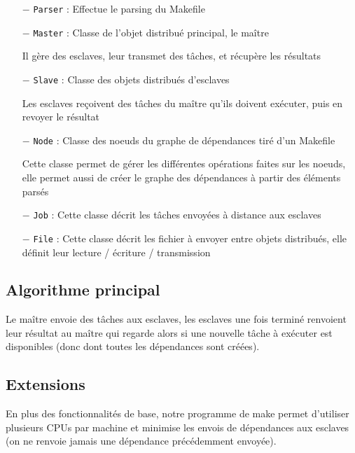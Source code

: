 \documentclass[a4paper, 11pt, titlepage]{article}
\begin{document}
\begin{itemize}

\item[$-$]
\lstinline!Parser! :
Effectue le parsing du Makefile

\item[$-$]
\lstinline!Master! :
Classe de l'objet distribué principal, le maître

Il gère des esclaves, leur transmet des tâches,
et récupère les résultats

\item[$-$]
\lstinline!Slave! :
Classe des objets distribués d'esclaves

Les esclaves reçoivent des tâches du maître qu'ils doivent exécuter,
puis en revoyer le résultat

\item[$-$]
\lstinline!Node! :
Classe des noeuds du graphe de dépendances tiré d'un Makefile

Cette classe permet de gérer les différentes opérations faites sur les noeuds, elle permet aussi de créer le graphe des dépendances à partir des éléments parsés


\item[$-$]
\lstinline!Job! :
Cette classe décrit les tâches envoyées à distance aux esclaves


\item[$-$]
\lstinline!File! :
Cette classe décrit les fichier à envoyer entre objets distribués,
elle définit leur lecture / écriture / transmission

\end{itemize}


\subsection {Algorithme principal}

Le maître envoie des tâches aux esclaves, les esclaves une fois terminé renvoient leur résultat au maître qui regarde alors si une nouvelle tâche à exécuter est disponibles (donc dont toutes les dépendances sont créées).



\subsection {Extensions}

En plus des fonctionnalités de base, notre programme de make permet d'utiliser plusieurs CPUs par machine et minimise les envois de dépendances aux esclaves (on ne renvoie jamais une dépendance précédemment envoyée).
\end{document}
